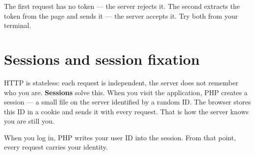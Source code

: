 \documentclass[11pt,a4paper,oneside]{book}
\newenvironment{Shaded}{\begin{snugshade}}{\end{snugshade}}
\newcommand{\KeywordTok}[1]{\textcolor[HTML]{007020}{\textbf{#1}}}
\newcommand{\DataTypeTok}[1]{\textcolor[HTML]{902000}{#1}}
\newcommand{\StringTok}[1]{\textcolor[HTML]{4070A0}{#1}}
\newcommand{\CommentTok}[1]{\textcolor[HTML]{60A0B0}{\textit{#1}}}
\newcommand{\FunctionTok}[1]{\textcolor[HTML]{06287E}{#1}}
\newcommand{\VariableTok}[1]{\textcolor[HTML]{19177C}{#1}}
\newcommand{\OperatorTok}[1]{\textcolor[HTML]{666666}{#1}}
\newcommand{\ExtensionTok}[1]{#1}
\newcommand{\AttributeTok}[1]{\textcolor[HTML]{7D9029}{#1}}
\newcommand{\NormalTok}[1]{#1}
\begin{document}
\begin{Shaded}
\end{Shaded}

The first request has no token --- the server rejects it. The
second extracts the token from the page and sends it --- the
server accepts it. Try both from your terminal.

\hypertarget{sessions-and-session-fixation}{%
\section{Sessions and session
fixation}\label{sessions-and-session-fixation}}

HTTP is stateless: each request is independent, the server does
not remember who you are. \textbf{Sessions} solve this. When you
visit the application, PHP creates a session --- a small file on
the server identified by a random ID. The browser stores this ID
in a cookie and sends it with every request. That is how the
server knows you are still you.

When you log in, PHP writes your user ID into the session. From
that point, every request carries your identity.
\end{document}
